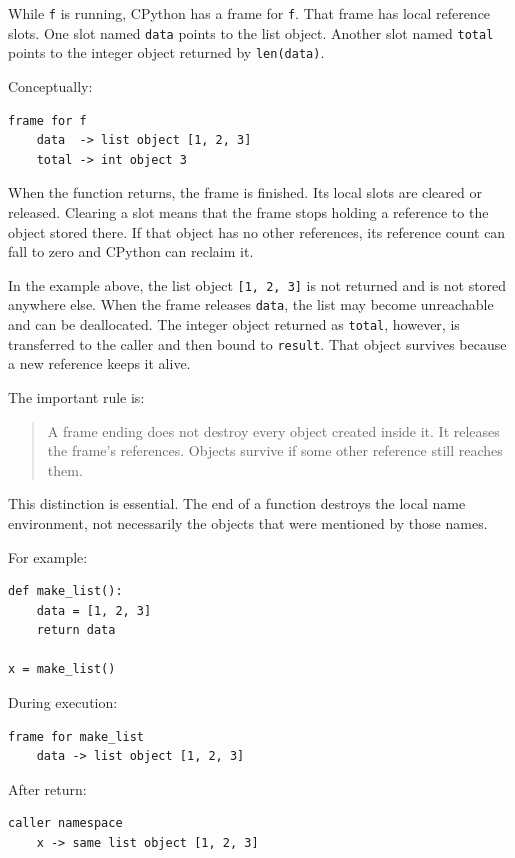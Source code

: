 While \texttt{f} is running, CPython has a frame for \texttt{f}. That frame has local reference slots. One slot named \texttt{data} points to the list object. Another slot named \texttt{total} points to the integer object returned by \texttt{len(data)}.

Conceptually:

\begin{verbatim}
frame for f
    data  -> list object [1, 2, 3]
    total -> int object 3
\end{verbatim}

When the function returns, the frame is finished. Its local slots are cleared or released. Clearing a slot means that the frame stops holding a reference to the object stored there. If that object has no other references, its reference count can fall to zero and CPython can reclaim it.

In the example above, the list object \texttt{[1, 2, 3]} is not returned and is not stored anywhere else. When the frame releases \texttt{data}, the list may become unreachable and can be deallocated. The integer object returned as \texttt{total}, however, is transferred to the caller and then bound to \texttt{result}. That object survives because a new reference keeps it alive.

The important rule is:

\begin{quote}
A frame ending does not destroy every object created inside it. It releases the frame's references. Objects survive if some other reference still reaches them.
\end{quote}

This distinction is essential. The end of a function destroys the local name environment, not necessarily the objects that were mentioned by those names.

For example:

\begin{verbatim}
def make_list():
    data = [1, 2, 3]
    return data

x = make_list()
\end{verbatim}

During execution:

\begin{verbatim}
frame for make_list
    data -> list object [1, 2, 3]
\end{verbatim}

After return:

\begin{verbatim}
caller namespace
    x -> same list object [1, 2, 3]
\end{verbatim}

